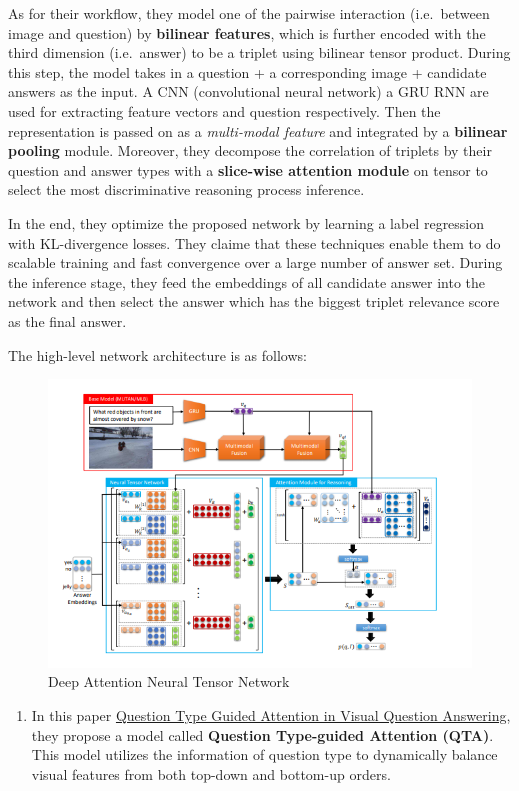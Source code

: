 \documentclass{acm_proc_article-sp}
\providecommand{\tightlist}{%
  \setlength{\itemsep}{0pt}\setlength{\parskip}{0pt}}
\begin{document}
As for their workflow, they model one of the pairwise interaction
(i.e.~between image and question) by \textbf{bilinear features}, which
is further encoded with the third dimension (i.e.~answer) to be a
triplet using bilinear tensor product. During this step, the model takes
in a question + a corresponding image + candidate answers as the input.
A CNN (convolutional neural network) a GRU RNN are used for extracting
feature vectors and question respectively. Then the representation is
passed on as a \emph{multi-modal feature} and integrated by a
\textbf{bilinear pooling} module. Moreover, they decompose the
correlation of triplets by their question and answer types with a
\textbf{slice-wise attention module} on tensor to select the most
discriminative reasoning process inference.

In the end, they optimize the proposed network by learning a label
regression with KL-divergence losses. They claime that these techniques
enable them to do scalable training and fast convergence over a large
number of answer set. During the inference stage, they feed the
embeddings of all candidate answer into the network and then select the
answer which has the biggest triplet relevance score as the final
answer.

The high-level network architecture is as follows:

\begin{figure}
\centering
\includegraphics{img/vqa.png}
\caption{Deep Attention Neural Tensor Network}
\end{figure}

\begin{enumerate}
\def\labelenumi{\arabic{enumi}.}
\setcounter{enumi}{1}
\tightlist
\item
  In this paper \href{https://arxiv.org/pdf/1804.02088.pdf}{Question
  Type Guided Attention in Visual Question Answering}, they propose a
  model called \textbf{Question Type-guided Attention (QTA)}. This model
  utilizes the information of question type to dynamically balance
  visual features from both top-down and bottom-up orders.
\end{enumerate}
\end{document}
